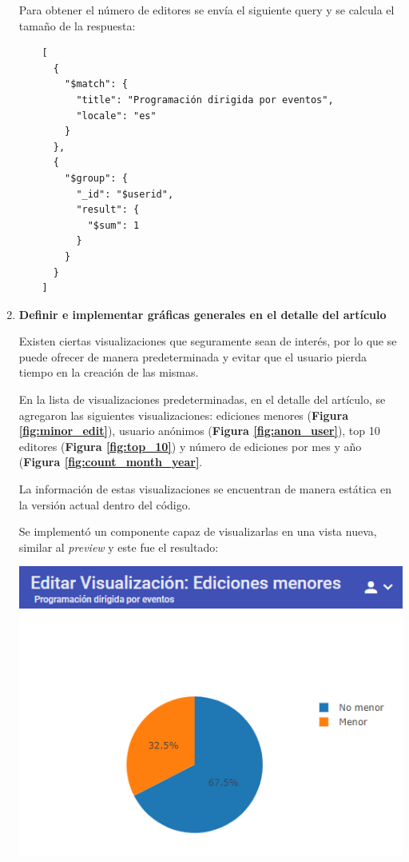 \begin{enumerate}
  Para obtener el número de editores se envía el siguiente query y se calcula el tamaño de la respuesta:
  \begin{verbatim}
    [
      {
        "$match": {
          "title": "Programación dirigida por eventos",
          "locale": "es"
        }
      },
      {
        "$group": {
          "_id": "$userid",
          "result": {
            "$sum": 1
          }
        }
      }
    ]
  \end{verbatim}
  
  \smallbreak
  \item\textbf{Definir e implementar gráficas generales en el detalle del artículo}
  \smallbreak
  
  Existen ciertas visualizaciones que seguramente sean de interés, por lo que se puede ofrecer de manera predeterminada y evitar que el usuario pierda tiempo en la creación de las mismas.
  
  En la lista de visualizaciones predeterminadas, en el detalle del artículo, se agregaron las siguientes visualizaciones: ediciones menores (\textbf{Figura \ref{fig:minor_edit}}), usuario anónimos (\textbf{Figura \ref{fig:anon_user}}), top 10 editores (\textbf{Figura \ref{fig:top_10}}) y número de ediciones por mes y año (\textbf{Figura \ref{fig:count_month_year}}.
  
  La información de estas visualizaciones se encuentran de manera estática en la versión actual dentro del código.
  
  Se implementó un componente capaz de visualizarlas en una vista nueva, similar al \textit{preview} y este fue el resultado:
  
  \begin{center}
    \bigbreak
    \includegraphics[scale=0.7]{images/marco_aplicativo/vis_default_minor_edit.png}
    \label{fig:minor_edit}
    \bigbreak
  \end{center}
  

\end{enumerate}
